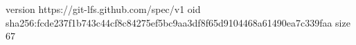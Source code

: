 version https://git-lfs.github.com/spec/v1
oid sha256:fcde237f1b743c44cf8c84275ef5bc9aa3df8f65d9104468a61490ea7c339faa
size 67
